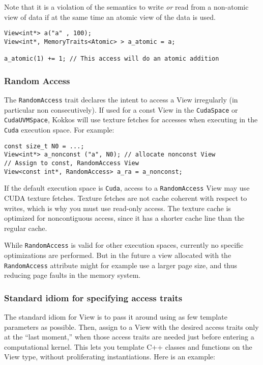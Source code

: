 Note that it is a violation of the semantics to write \emph{or} read from a 
non-atomic view of data if at the same time an atomic view of the data is used.

\begin{lstlisting}
View<int*> a("a" , 100);
View<int*, MemoryTraits<Atomic> > a_atomic = a;

a_atomic(1) += 1; // This access will do an atomic addition
\end{lstlisting} 

\subsubsection{Random Access}

The \lstinline|RandomAccess| trait declares the intent to access a View
irregularly (in particular non consecutively). If used for a const View 
in the \lstinline|CudaSpace| or \lstinline|CudaUVMSpace|, Kokkos will use 
texture fetches for accesses when executing in the \lstinline|Cuda| execution
space.
For example:
\begin{lstlisting}
const size_t N0 = ...;
View<int*> a_nonconst ("a", N0); // allocate nonconst View
// Assign to const, RandomAccess View
View<const int*, RandomAccess> a_ra = a_nonconst;
\end{lstlisting}
If the default execution space is \lstinline!Cuda!, access to a
\lstinline!RandomAccess! View may use CUDA texture fetches.  Texture
fetches are not cache coherent with respect to writes, which is why
you must use read-only access.  The texture cache is optimized for
noncontiguous access, since it has a shorter cache line than the
regular cache.

While \lstinline!RandomAccess! is valid for other execution spaces, 
currently no specific optimizations are performed. But in the future a view
allocated with the \lstinline!RandomAccess! attribute might for example
use a larger page size, and thus reducing page faults in the memory 
system.

\subsubsection{Standard idiom for specifying access traits}

The standard idiom for View is to pass it around using as few template
parameters as possible.  Then, assign to a View with the desired
access traits only at the ``last moment,'' when those access traits
are needed just before entering a computational kernel.  This lets you
template C++ classes and functions on the View type, without
proliferating instantiations.  Here is an example:


